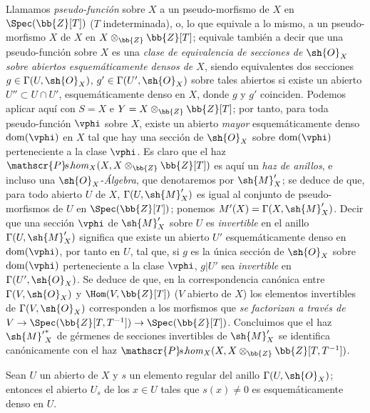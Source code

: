 \begin{env}[20.2.8]
\label{IV.20.2.8}
Llamamos \emph{pseudo-función} sobre $X$ a un pseudo-morfismo de $X$ en $\Spec(\bb{Z}[T])$ ($T$ indeterminada), o, lo que equivale a lo mismo, a un pseudo-morfismo $X$ de $X$ en $X\otimes_{\bb{Z}}\bb{Z}[T]$; equivale también  a decir que una pseudo-función sobre $X$ es una \emph{clase de equivalencia de secciones de $\sh{O}_X$ sobre abiertos esquemáticamente densos de $X$}, siendo equivalentes dos secciones $g\in\Gamma(U,\sh{O}_X)$, $g'\in\Gamma(U',\sh{O}_X)$ sobre tales abiertos si existe un abierto $U''\subset U\cap U'$, esquemáticamente denso en $X$, donde $g$ y $g'$ coinciden.
Podemos aplicar aquí  con $S=X$ e $Y=X\otimes_{\bb{Z}}\bb{Z}[T]$; por tanto, para toda pseudo-función $\vphi$ sobre $X$, existe un abierto \emph{mayor} esquemáticamente denso $\operatorname{dom}(\vphi)$ en $X$ tal que hay una sección de $\sh{O}_X$ sobre $\operatorname{dom}(\vphi)$ perteneciente a la clase $\vphi$.
Es claro que el haz $\mathscr{P}\!s.\!\mathit{hom}_X(X,X\otimes_{\bb{Z}}\bb{Z}[T])$ es aquí un \emph{haz de anillos}, e incluso una $\sh{O}_X$-\emph{Álgebra}, que denotaremos por $\sh{M}'_X$; se deduce de  que, para todo abierto $U$ de $X$, $\Gamma(U,\sh{M}'_X)$ es igual al conjunto de pseudo-morfismos de $U$ en $\Spec(\bb{Z}[T])$; ponemos $M'(X)=\Gamma(X,\sh{M}'_X)$.
Decir que una sección $\vphi$ de $\sh{M}'_X$ sobre $U$ es \emph{invertible} en el anillo $\Gamma(U,\sh{M}'_X)$ significa que existe un abierto $U'$ esquemáticamente denso en $\operatorname{dom}(\vphi)$, por tanto en $U$, tal que, si $g$ es la única sección de $\sh{O}_X$ sobre $\operatorname{dom}(\vphi)$ perteneciente a la clase $\vphi$, $g|U'$ sea \emph{invertible} en $\Gamma(U',\sh{O}_X)$.
Se deduce de  que, en la correspondencia canónica entre $\Gamma(V,\sh{O}_X)$ y $\Hom(V,\bb{Z}[T])$ ($V$ abierto de $X$) los elementos invertibles de $\Gamma(V,\sh{O}_X)$ corresponden a los morfismos que \emph{se}
\emph{factorizan a través de} $V\to\Spec(\bb{Z}[T,T^{-1}])\to\Spec(\bb{Z}[T])$.
Concluimos que el haz ${\sh{M}'}^*_X$ de gérmenes de secciones invertibles de $\sh{M}'_X$ se identifica canónicamente con el haz $\mathscr{P}\!s.\!\mathit{hom}_X(X,X\otimes_{\bb{Z}}\bb{Z}[T,T^{-1}])$.
\end{env}

\begin{lemma}[20.2.9]
\label{IV.20.2.9}
Sean $U$ un abierto de $X$ y $s$ un elemento regular del anillo $\Gamma(U,\sh{O}_X)$; entonces el abierto $U_s$ de los $x\in U$ tales que $s(x)\neq0$ es esquemáticamente denso en $U$.
\end{lemma}


